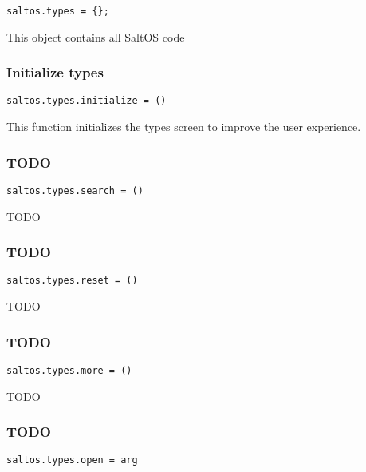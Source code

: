 \documentclass[a4paper]{article}
\begin{document}
\begin{lstlisting}
saltos.types = {};
\end{lstlisting}

This object contains all SaltOS code

\hypertarget{toc132}{}
\subsubsection{Initialize types}

\begin{lstlisting}
saltos.types.initialize = ()
\end{lstlisting}

This function initializes the types screen to improve the user experience.

\hypertarget{toc133}{}
\subsubsection{TODO}

\begin{lstlisting}
saltos.types.search = ()
\end{lstlisting}

TODO

\hypertarget{toc134}{}
\subsubsection{TODO}

\begin{lstlisting}
saltos.types.reset = ()
\end{lstlisting}

TODO

\hypertarget{toc135}{}
\subsubsection{TODO}

\begin{lstlisting}
saltos.types.more = ()
\end{lstlisting}

TODO

\hypertarget{toc136}{}
\subsubsection{TODO}

\begin{lstlisting}
saltos.types.open = arg
\end{lstlisting}
\end{document}
